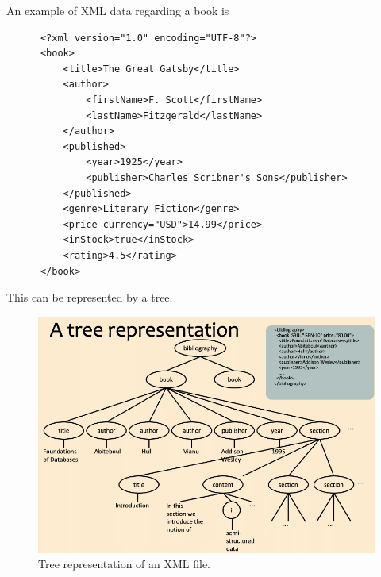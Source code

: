 \documentclass{article}
\begin{document}
  \begin{example}
    An example of XML data regarding a book is 
    \begin{lstlisting}
      <?xml version="1.0" encoding="UTF-8"?>
      <book>
          <title>The Great Gatsby</title>
          <author>
              <firstName>F. Scott</firstName>
              <lastName>Fitzgerald</lastName>
          </author>
          <published>
              <year>1925</year>
              <publisher>Charles Scribner's Sons</publisher>
          </published>
          <genre>Literary Fiction</genre>
          <price currency="USD">14.99</price>
          <inStock>true</inStock>
          <rating>4.5</rating>
      </book> 
    \end{lstlisting}
    This can be represented by a tree. 

    \begin{figure}[H]
      \centering 
      \includegraphics[scale=0.4]{img/tree_rep.png}
      \caption{Tree representation of an XML file.} 
      \label{fig:tree_rep}
    \end{figure}
  \end{example}
\end{document}
